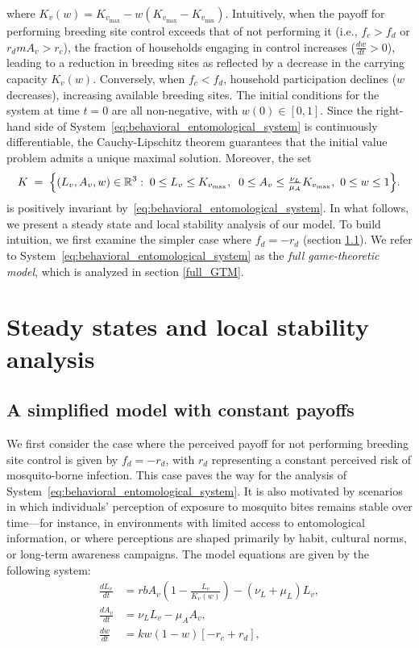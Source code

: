 \documentclass{article}
\theoremstyle{remark}
\theoremstyle{custom} %
\begin{document}
where $K_v(w) = K_{v_{\text{max}}} - w(K_{v_{\text{max}}} - K_{v_{\text{min}}})$. Intuitively, when the payoff for performing breeding site control exceeds that of not performing it (i.e., \( f_c > f_d  \) or $r_d m A_v > r_c $), the fraction of households engaging in control increases (\( \frac{dw}{dt} > 0 \)), leading to a reduction in breeding sites as reflected by a decrease in the carrying capacity \( K_v(w) \). Conversely, when \( f_c < f_d \), household participation declines (\( w \) decreases), increasing available breeding sites. The initial conditions for the system at time \( t = 0 \) are all non-negative, with \( w(0) \in [0, 1] \). Since the right-hand side of System~\eqref{eq:behavioral_entomological_system} is continuously differentiable, the Cauchy-Lipschitz theorem guarantees that the initial value problem admits a unique maximal solution. Moreover, the set
\[
K \;=\; \Bigl\{(L_v,A_v,w)\in \mathbb{R}^3:\; 0\le L_v\le K_{v_{\max}},\;\; 0\le A_v\le \tfrac{\nu_L}{\mu_A}K_{v_{\max}}, \  0 \leq w \leq 1\Bigr\}.
\]
is positively invariant by~\eqref{eq:behavioral_entomological_system}. In what follows, we present a steady state and local stability analysis of our model. To build intuition, we first examine the simpler case where \( f_d =- r_d \) (section \ref{simple_model}). We refer to System~\eqref{eq:behavioral_entomological_system} as the \emph{full game-theoretic model}, which is analyzed in section \ref{full_GTM}.
 



\section{Steady states and local stability analysis} \label{analysis}


\subsection{A simplified model with constant payoffs} 
\label{simple_model}

We first consider the case where the perceived payoff for not performing breeding site control is given by \( f_d = -r_d \), with \( r_d \) representing a constant perceived risk of mosquito-borne infection. This case paves the way for the analysis of System~\eqref{eq:behavioral_entomological_system}. It is also motivated by scenarios in which individuals' perception of exposure to mosquito bites remains stable over time—for instance, in environments with limited access to entomological information, or where perceptions are shaped primarily by habit, cultural norms, or long-term awareness campaigns. The model equations are given by the following system: 
\begin{equation} 
\begin{aligned}
\frac{dL_v}{dt} &= rbA_v \left(1 - \frac{L_v}{K_v(w)} \right) - (\nu_L + \mu_L)L_v, \\
\frac{dA_v}{dt} &= \nu_L L_v - \mu_A A_v, \\
\frac{dw}{dt}   &= k w(1 - w)\left[-r_c + r_d\right],
\end{aligned}
\label{eq:simplified_model_1}
\end{equation}
\end{document}
